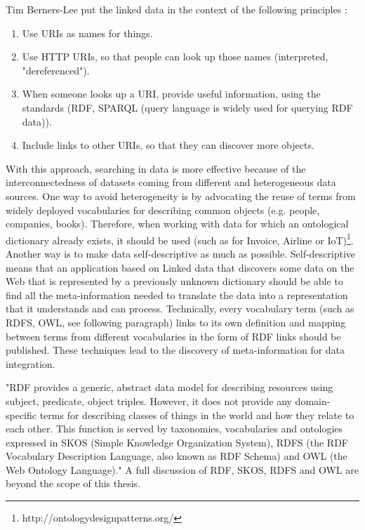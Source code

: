 				Tim Berners-Lee put the linked data in the context of the following principles \cite{Heath2011}:
				
				\begin{enumerate}
					\item Use URIs as names for things.
					\item Use HTTP URIs, so that people can look up those names (interpreted, "dereferenced").
					\item When someone looks up a URI, provide useful information, using the standards (RDF, SPARQL (query language is widely used for querying RDF data)).
					\item Include links to other URIs, so that they can discover more objects. 
				\end{enumerate}
				
				With this approach, searching in data is more effective because of the interconnectedness of datasets coming from different and heterogeneous data sources. One way to avoid heterogeneity is by advocating the reuse of terms from widely deployed vocabularies for describing common objects (e.g. people, companies, books). Therefore, when working with data for which an ontological dictionary already exists, it should be used (such as for Invoice, Airline or IoT)\footnote{http://ontologydesignpatterns.org/}. Another way is to make data self-descriptive as much as possible. Self-descriptive means that an application based on Linked data that discovers some data on the Web that is represented by a previously unknown dictionary should be able to find all the meta-information needed to translate the data into a representation that it understands and can process. Technically, every vocabulary term (such as RDFS, OWL, see following paragraph) links to its own definition and mapping between terms from different vocabularies in the form of RDF links should be published. These techniques lead to the discovery of meta-information for data integration.
			
				"RDF provides a generic, abstract data model for describing resources using subject, predicate, object triples. However, it does not provide any domain-specific terms for describing classes of things in the world and how they relate to each other. This function is served by taxonomies, vocabularies and ontologies expressed in SKOS (Simple Knowledge Organization System), RDFS (the RDF Vocabulary Description Language, also known as RDF Schema) and OWL (the Web Ontology Language)." \cite{Heath2011} A full discussion of RDF, SKOS, RDFS and OWL are beyond the scope of this thesis.
			
